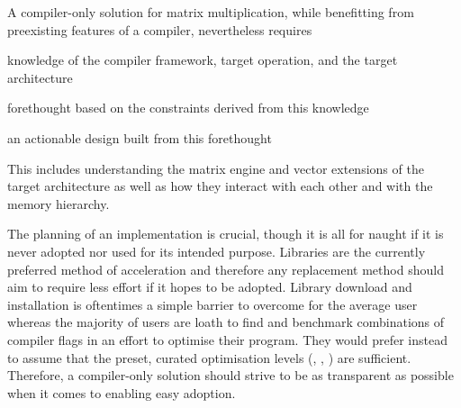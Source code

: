 \documentclass[\main/thesis.tex]{subfiles}
\begin{document}
A compiler-only solution for matrix multiplication, while benefitting from preexisting features of a compiler, nevertheless requires
\begin{enumerate*}[itemjoin={{; }}, itemjoin*={{; and }}, label={}, afterlabel={}, after={.}]
  \item knowledge of the compiler framework, target operation, and the target architecture
  \item forethought based on the constraints derived from this knowledge
  \item an actionable design built from this forethought
\end{enumerate*}
This includes understanding the matrix engine and vector extensions of the target architecture as well as how they interact with each other and with the memory hierarchy.

The planning of an implementation is crucial, though it is all for naught if it is never adopted nor used for its intended purpose.
Libraries are the currently preferred method of acceleration and therefore any replacement method should aim to require less effort if it hopes to be adopted.
Library download and installation is oftentimes a simple barrier to overcome for the average user whereas the majority of users are loath to find and benchmark combinations of compiler flags in an effort to optimise their program.
They would prefer instead to assume that the preset, curated optimisation levels (\ie {}, , ) are sufficient.
Therefore, a compiler-only solution should strive to be as transparent as possible when it comes to enabling easy adoption.

\end{document}
